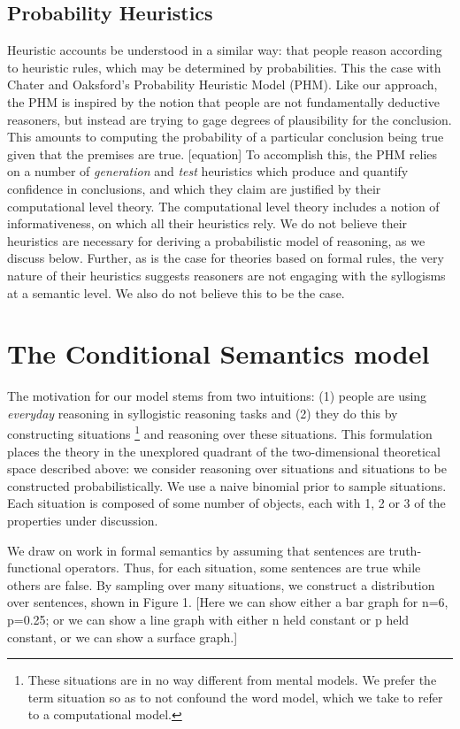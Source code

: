 \documentclass[10pt,letterpaper]{article}
\begin{document}
\subsection{Probability Heuristics}

Heuristic accounts be understood in a similar way: that people reason according to heuristic rules, which may be determined by probabilities. This the case with Chater and Oaksford's Probability Heuristic Model (PHM). Like our approach, the PHM is inspired by the notion that people are not fundamentally deductive reasoners, but instead are trying to gage degrees of plausibility for the conclusion. This amounts to computing the probability of a particular conclusion being true given that the premises are true. [equation] To accomplish this, the PHM relies on a number of {\em generation} and {\em test} heuristics which produce and quantify confidence in conclusions, and which they claim are justified by their computational level theory. The computational level theory includes a notion of informativeness, on which all their heuristics rely. We do not believe their heuristics are necessary for deriving a probabilistic model of reasoning, as we discuss below. Further, as is the case for theories based on formal rules, the very nature of their heuristics suggests reasoners are not engaging with the syllogisms at a semantic level. We also do not believe this to be the case. 


\section{The Conditional Semantics model}

The motivation for our model stems from two intuitions: (1) people are using \emph{everyday} reasoning in syllogistic reasoning tasks and (2) they do this by constructing situations \footnote{These situations are in no way different from mental models. We prefer the term situation so as to not confound the word model, which we take to refer to a computational model.} and reasoning over these situations. This formulation places the theory in the unexplored quadrant of the two-dimensional theoretical space described above: we consider reasoning over situations and situations to be constructed probabilistically. We use a naive binomial prior to sample situations. Each situation is composed of some number of objects, each with 1, 2 or 3 of the properties under discussion. 

We draw on work in formal semantics by assuming that sentences are truth-functional operators. Thus, for each situation, some sentences are true while others are false. By sampling over many situations, we construct a distribution over sentences, shown in Figure 1. [Here we can show either a bar graph for n=6, p=0.25; or we can show a line graph with either n held constant or p held constant, or we can show a surface graph.]
\end{document}
